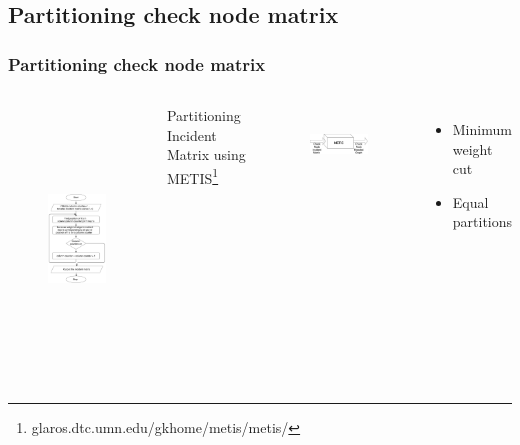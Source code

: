 \documentclass[xcolor=dvipsname]
{beamer}
\begin{document}
\subsection{ Partitioning check node matrix }
\begin{frame}[t]
\frametitle{ Partitioning check node matrix }
\begin{columns}		
\vspace{-5mm}
\begin{figure}
\includegraphics[height=7cm,width=5cm]{weightedcheck}
\end{figure}
	
	\pause
	
				
\alert{Partitioning Incident Matrix using METIS}\footnote{glaros.dtc.umn.edu/gkhome/metis/metis/}		\\
\begin{figure}			
\includegraphics[height=2cm,width=5cm]{METIS}
			\end{figure}	
\begin{itemize}
[triangle]
\item Minimum weight cut
\item Equal partitions
\end{itemize}			
\end{columns}
\end{frame}


	
\end{document}
